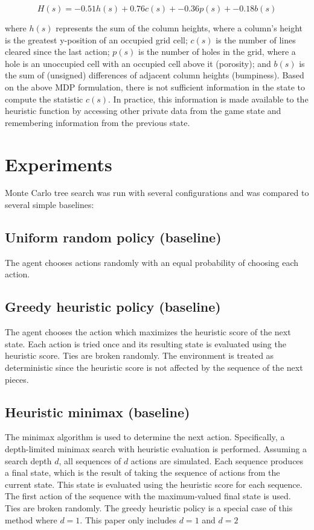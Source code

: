 \documentclass[letterpaper]{article} %
\begin{document}
\[H(s) = -0.51h(s) + 0.76c(s) + -0.36p(s) + -0.18b(s)\]

\noindent{}where \(h(s)\) represents the sum of the column heights, where a column's height is the greatest y-position of an occupied grid cell; \(c(s)\) is the number of lines cleared since the last action; \(p(s)\) is the number of holes in the grid, where a hole is an unoccupied cell with an occupied cell above it (porosity); and \(b(s)\) is the sum of (unsigned) differences of adjacent column heights (bumpiness). Based on the above MDP formulation, there is not sufficient information in the state to compute the statistic \(c(s)\). In practice, this information is made available to the heuristic function by accessing other private data from the game
state and remembering information from the previous state.


\section{Experiments}

Monte Carlo tree search was run with several configurations and was compared to several simple baselines:

\subsection{Uniform random policy (baseline)}
The agent chooses actions randomly with an equal probability of choosing each action.

\subsection{Greedy heuristic policy (baseline)}
The agent chooses the action which maximizes the heuristic score of the next state. Each action is tried once and its resulting state is evaluated using
the heuristic score. Ties are broken randomly. The environment is treated as deterministic since the heuristic score is not affected by the sequence of the next pieces.

\subsection{Heuristic minimax (baseline)}
The minimax algorithm is used to determine the next action. Specifically, a depth-limited minimax search with heuristic evaluation is performed. Assuming a search depth \(d\), all sequences of \(d\) actions are simulated. Each sequence produces a final state, which is the result of taking the sequence of actions from the current state. This state is evaluated using the heuristic score for each sequence. The first action of the sequence with the maximum-valued final state is used. Ties are broken randomly. The greedy heuristic policy is a special case of this method where \(d=1\). This paper only includes \(d=1\) and \(d=2\)
\end{document}
